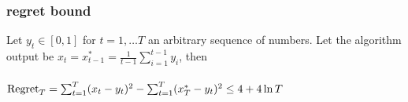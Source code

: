 \documentclass[handout]{beamer}
\begin{document}
\begin{frame}
\frametitle{regret bound}
\begin{theorem}
Let $y_t \in [0,1]$ for $t=1,\ldots T$ an arbitrary sequence of
numbers. Let the algorithm output be
$ x_t = x_{t-1}^* = \frac{1}{t-1} \sum_{i=1}^{t-1} y_i$, then\\
~\\
$ \mbox{Regret}_T = \sum_{t=1}^T (x_t-y_t)^2 - \sum_{t=1}^T (x^*_T-y_t)^2
\leq 4 + 4 \ln T$
\end{theorem}
\end{frame}
\end{document}
